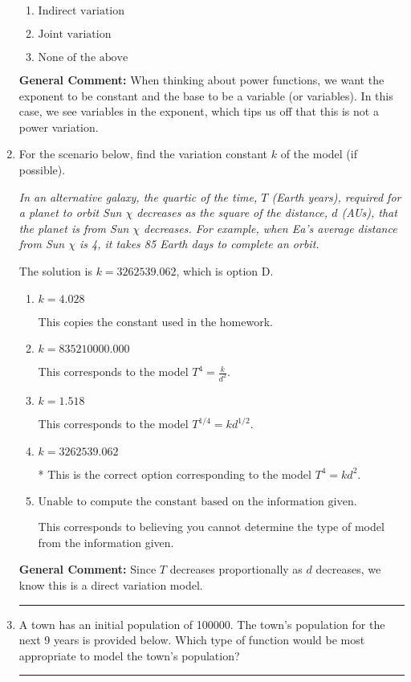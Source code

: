 \documentclass{extbook}[14pt]
\newcommand{\litem}[1]{\item #1

\rule{\textwidth}{0.4pt}}
\begin{document}
\begin{enumerate}
{\begin{enumerate}[label=\Alph*.]
\item \( \text{Indirect variation} \)


\item \( \text{Joint variation} \)


\item \( \text{None of the above} \)


\end{enumerate}

\textbf{General Comment:} When thinking about power functions, we want the exponent to be constant and the base to be a variable (or variables). In this case, we see variables in the exponent, which tips us off that this is not a power variation.
}
\litem{
For the scenario below, find the variation constant $k$ of the model (if possible).

\begin{center}
    \textit{ In an alternative galaxy, the quartic of the time, $T$ (Earth years), required for a planet to orbit Sun $\chi$ decreases as the square of the distance, $d$ (AUs), that the planet is from Sun $\chi$ decreases. For example, when Ea's average distance from Sun $\chi$ is 4, it takes 85 Earth days to complete an orbit. }
\end{center}
The solution is \( k = 3262539.062 \), which is option D.\begin{enumerate}[label=\Alph*.]
\item \( k = 4.028 \)

This copies the constant used in the homework.
\item \( k = 835210000.000 \)

This corresponds to the model $T^{4} = \frac{k}{d^{2}}$.
\item \( k = 1.518 \)

This corresponds to the model $T^{1/4} = k d^{1/2}$.
\item \( k = 3262539.062 \)

* This is the correct option corresponding to the model $T^{4} = k d^{2}$.
\item \( \text{Unable to compute the constant based on the information given.} \)

This corresponds to believing you cannot determine the type of model from the information given.
\end{enumerate}

\textbf{General Comment:} Since $T$ decreases proportionally as $d$ decreases, we know this is a direct variation model.
}
\litem{
A town has an initial population of 100000. The town's population for the next 9 years is provided below. Which type of function would be most appropriate to model the town's population?


}
\end{enumerate}
\end{document}
